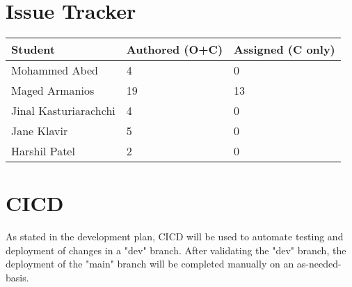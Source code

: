 \documentclass{article}
\begin{document}
\section{Issue Tracker}

\begin{table}[H]
\centering
\begin{tabular}{lll}
\toprule
\textbf{Student} & \textbf{Authored (O+C)} & \textbf{Assigned (C only)}\\
\midrule
Mohammed Abed & 4 & 0 \\
Maged Armanios & 19 & 13 \\
Jinal Kasturiarachchi & 4 & 0 \\
Jane Klavir & 5 & 0 \\
Harshil Patel & 2 & 0 \\
\bottomrule
\end{tabular}
\end{table}

\section{CICD}

As stated in the development plan, CICD will be used to automate testing and deployment of changes in a "dev" branch. After validating the "dev" branch, the deployment of the "main" branch will be completed manually on an as-needed-basis.
\end{document}
